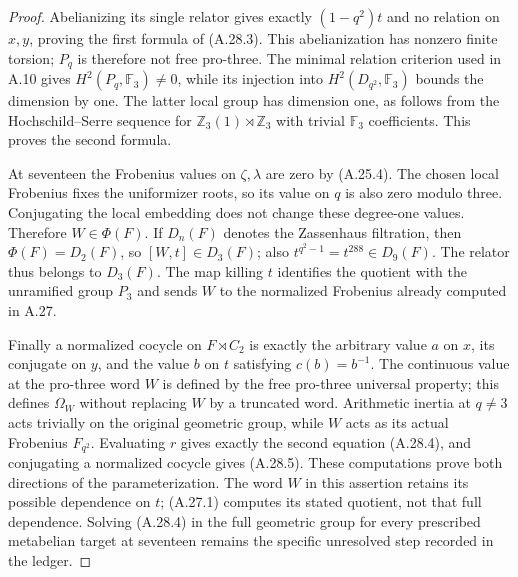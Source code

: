 \begin{proof}
Abelianizing its single relator gives
exactly $(1-q^2)t$ and no relation on
$x,y$, proving the first formula of
(A.28.3). This abelianization has
nonzero finite torsion; $P_q$ is therefore
not free pro-three. The minimal relation
criterion used in A.10 gives
$H^2(P_q,\mathbb F_3)\ne0$, while its
injection into $H^2(D_{q^2},\mathbb F_3)$
bounds the dimension by one. The latter
local group has dimension one, as follows
from the Hochschild--Serre sequence for
$\mathbb Z_3(1)\rtimes\mathbb Z_3$ with
trivial $\mathbb F_3$ coefficients.
This proves the second formula.

At seventeen the Frobenius values on
$\zeta,\lambda$ are zero by (A.25.4).
The chosen local Frobenius fixes the
uniformizer roots, so its value on
$q$ is also zero modulo three. Conjugating
the local embedding does not change
these degree-one values. Therefore
$W\in\Phi(F)$. If $D_n(F)$ denotes the
Zassenhaus filtration, then
$\Phi(F)=D_2(F)$, so $[W,t]\in D_3(F)$;
also $t^{q^2-1}=t^{288}\in D_9(F)$.
The relator thus belongs to $D_3(F)$.
The map killing $t$ identifies the
quotient with the unramified group
$P_3$ and sends $W$ to the normalized
Frobenius already computed in A.27.

Finally a normalized cocycle on
$F\rtimes C_2$ is exactly the arbitrary
value $a$ on $x$, its conjugate on $y$,
and the value $b$ on $t$ satisfying
$c(b)=b^{-1}$. The continuous value at
the pro-three word $W$ is defined by
the free pro-three universal property;
this defines $\Omega_W$ without replacing
$W$ by a truncated word. Arithmetic
inertia at $q\ne3$ acts trivially on
the original geometric group, while
$W$ acts as its actual Frobenius
$F_{q^2}$. Evaluating $r$ gives exactly
the second equation (A.28.4), and
conjugating a normalized cocycle gives
(A.28.5). These computations prove both
directions of the parameterization.
The word $W$ in this assertion retains
its possible dependence on $t$;
(A.27.1) computes its stated quotient,
not that full dependence. Solving
(A.28.4) in the full geometric group
for every prescribed metabelian target
at seventeen remains the specific
unresolved step recorded in the ledger.
\end{proof}

